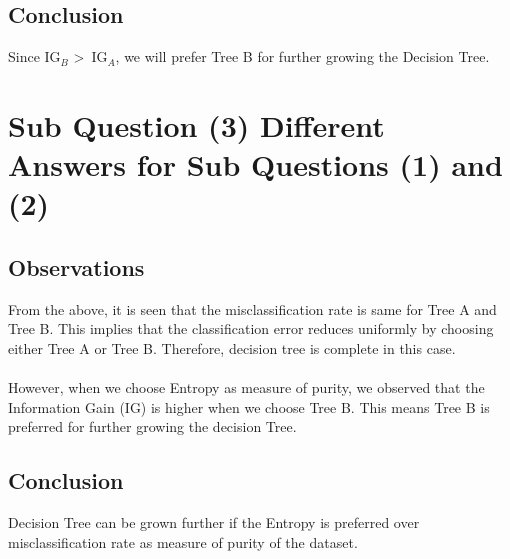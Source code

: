 \documentclass[a4paper,11pt]{article}
\newcommand\tab[1][1cm]{\hspace*{#1}}
\begin{document}
\begin{mlsolution}
\subsection*{Conclusion}
\tab Since IG$_B$ \textgreater\ IG$_A$, we will prefer Tree B for further growing the Decision Tree.
\section*{Sub Question (3) Different Answers for Sub Questions (1) and (2)}
\subsection*{Observations}
\tab From the above, it is seen that the misclassification rate is same for Tree A and Tree B. This implies that the classification error reduces uniformly by choosing either Tree A or Tree B. Therefore, decision tree is complete in this case.
\noindent\\
\\
\tab However, when we choose Entropy as measure of purity, we observed that the Information Gain (IG) is higher when we choose Tree B. This means Tree B is preferred for further growing the decision Tree.
\subsection*{Conclusion}
\tab Decision Tree can be grown further if the Entropy is preferred over misclassification rate as measure of purity of the dataset.

\

\end{mlsolution}
\end{document}
